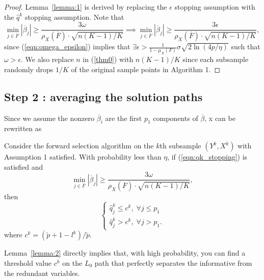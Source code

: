 \documentclass[11pt,review,authoryear]{elsarticle}
\begin{document}
\begin{appendices}
\begin{proof}
  Lemma~\ref{lemma:1} is derived by replacing the $\epsilon$ stopping assumption with the $\widehat{q}^k$ stopping assumption. Note that
  \begin{displaymath}
    \min_{j\in\overline{F}}\left|\overline{\beta}_{j}\right|\geqslant\frac{3\omega}{\rho_{X}\left(\overline{F}\right)\cdot\sqrt{n\left(K-1\right)/K}} \implies \min_{j\in\overline{F}}\left|\overline{\beta}_{j}\right| \geqslant \frac{3\epsilon}{\rho_{X}\left(\overline{F}\right)\cdot\sqrt{n\left(K-1\right)/K}},
\end{displaymath}
since (\ref{eqn:omega_epsilon}) implies that $\exists \epsilon > \frac{1}{1-\mu_{X}\left(F\right)}\sigma\sqrt{2\ln\left(4p/\eta\right)}$ such that $\omega > \epsilon$.  We also replace $n$ in (\ref{thm0}) with $n\left(K-1\right)/K$ since each subsample randomly drops $1/K$ of the original sample points in Algorithm 1.
\end{proof}
\medskip


\subsection*{Step 2 : averaging the solution paths}

Since we assume the nonzero $\overline{\beta}_i$ are the first $p_1$ components of $\overline{\beta}$, x can be rewritten as
%
\begin{lemma}
  Consider the forward selection algorithm on the $k$th subsample $\left(Y^{k},X^{k}\right)$ with Assumption 1 satisfied. With probability less than $\eta$, if (\ref{eqn:qk_stopping}) is satisfied and
  \[
      \min_{j\in\overline{F}}\left|\overline{\beta}_{j}\right|\geqslant\frac{3\omega}{\rho_{X}\left(\overline{F}\right)\cdot\sqrt{n\left(K-1\right)/K}},
  \]
  then
  \[
  \begin{cases}
      \widehat{q}_j^k \leqslant c^k, \; \forall j\leqslant p_1\\
      \widehat{q}_j^k > c^k, \; \forall j>p_1.
  \end{cases}
  \]
  where $c^k = \left(\widetilde{p} + 1 - l^k\right) / \widetilde{p}$.
  \label{lemma:2}
\end{lemma}
%
\noindent
Lemma~\ref{lemma:2} directly implies that, with high probability, you can find a threshold value $c^k$ on the $L_0$ path that perfectly separates the informative from the redundant variables.


\end{appendices}
\end{document}
